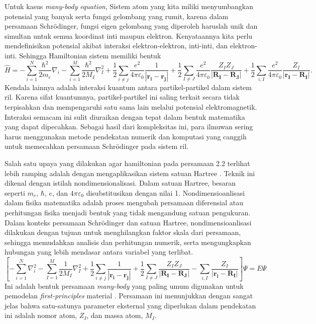 Untuk kasus \textit{many-body \schro} \textit{equation}, Sistem atom yang kita miliki menyumbangkan potensial yang banyak serta fungsi gelombang yang rumit, karena dalam persamaan Schrödinger, fungsi eigen gelombang yang diperoleh haruslah unik dan simultan untuk semua koordinat inti maupun elektron. Kenyataannya kita perlu mendefinisikan potensial akibat interaksi elektron-elektron, inti-inti, dan elektron-inti. Sehingga Hamiltonian sistem memiliki bentuk
\begin{equation}
\hat{H} = -\sum_{i=1}^N \dfrac{\hbar^2}{2m_e}\nabla_i-\sum_{i=1}^M \dfrac{\hbar^2}{2M_I}\nabla_I^2+\dfrac{1}{2}\sum_{i\neq j}\dfrac{e^2}{4\pi \varepsilon_0}\dfrac{1}{|\mathbf{r_i}-\mathbf{r_j}|}+\dfrac{1}{2}\sum_{I\neq J}\dfrac{e^2}{4\pi \varepsilon_0}\dfrac{Z_IZ_J}{|\mathbf{R_I}-\mathbf{R_J}|}+\dfrac{1}{2}\sum_{i,I}\dfrac{e^2}{4\pi \varepsilon_0}\dfrac{Z_I}{|\mathbf{r_I}-\mathbf{R_I}|}.
\end{equation}
Kendala lainnya adalah interaksi kuantum antara partikel-partikel dalam sistem ril. Karena sifat kuantumnya, partikel-partikel ini saling terkait secara tidak terpisahkan dan mempengaruhi satu sama lain melalui potensial elektromagnetik. Interaksi semacam ini sulit diuraikan dengan tepat dalam bentuk matematika yang dapat dipecahkan. Sebagai hasil dari kompleksitas ini, para ilmuwan sering harus menggunakan metode pendekatan numerik dan komputasi yang canggih untuk memecahkan persamaan Schrödinger pada sistem ril.

Salah satu upaya yang dilakukan agar hamiltonian pada persamaan 2.2 terlihat lebih ramping adalah dengan mengaplikasikan sistem satuan Hartree \citep{hartree1928wave}. Teknik ini dikenal dengan istilah nondimensionalisasi. Dalam satuan Hartree, besaran seperti $m_e$, $\hbar$, $e$, dan $4\pi\varepsilon_0$ disubstitusikan dengan nilai 1. Nondimensioanlisasi dalam fisika matematika adalah proses mengubah persamaan diferensial atau perhitungan fisika menjadi bentuk yang tidak mengandung satuan pengukuran. Dalam konteks persamaan Schrödinger dan satuan Hartree, nondimensioanlisasi dilakukan dengan tujuan untuk menghilangkan faktor skala dari persamaan, sehingga memudahkan analisis dan perhitungan numerik, serta mengungkapkan hubungan yang lebih mendasar antara variabel yang terlibat.
\begin{equation}
\left[-\sum_{i=1}^N \nabla_i^2-\sum_{I=1}^M \frac{1}{2M_I}\nabla_I^2+\frac{1}{2}\sum_{i\neq j}\frac{1}{|\mathbf{r_i}-\mathbf{r_j}|}+\frac{1}{2}\sum_{I\neq J}\frac{Z_I Z_J}{|\mathbf{R_I}-\mathbf{R_J}|}-\sum_{i,I}\frac{Z_I}{|\mathbf{r_i}-\mathbf{R_I}|} \right]\Psi=E\Psi
\end{equation}
Ini adalah bentuk persamaan \textit{many-body \schro} yang paling umum digunakan untuk
pemodelan \textit{first-principles} material \citep{Guistino}. Persamaan ini menunjukkan dengan sangat jelas bahwa satu-satunya
parameter eksternal yang diperlukan dalam pendekatan ini adalah nomor atom, $Z_I$, dan
massa atom, $M_I$.

